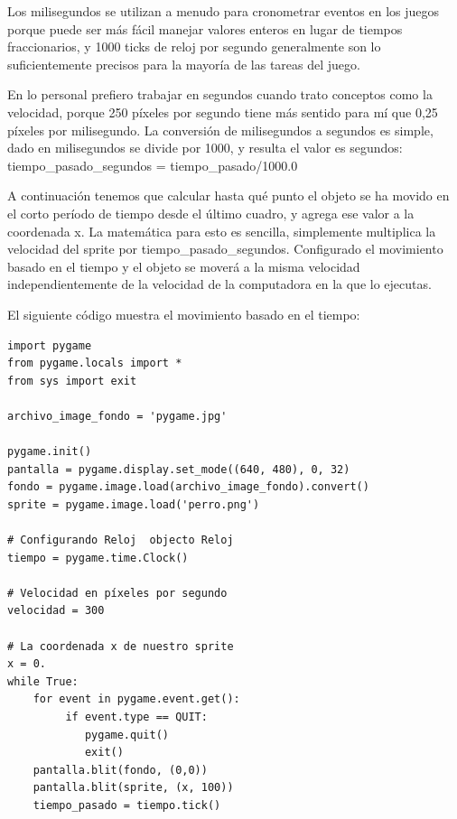 {Los milisegundos se utilizan a menudo para cronometrar eventos en los juegos porque puede ser más fácil manejar
valores enteros en lugar de tiempos fraccionarios, y 1000 ticks de reloj por segundo generalmente son lo 
suficientemente precisos para la mayoría de las tareas del juego. 


En lo personal  prefiero trabajar en segundos cuando trato conceptos como la velocidad, porque 250 píxeles por
segundo tiene más sentido para mí que 0,25 píxeles por milisegundo. La conversión de milisegundos a segundos es
simple, dado en milisegundos se divide por 1000, y resulta el valor es segundos:
 {\ttfamily tiempo\_pasado\_segundos = tiempo\_pasado/1000.0}






A continuación tenemos que calcular hasta qué punto el objeto se ha movido en el corto período de tiempo desde el último cuadro, 
y agrega ese valor a la coordenada x. La matemática para esto es sencilla, simplemente multiplica la velocidad del sprite por
{\ttfamily tiempo\_pasado\_segundos}.  Configurado el  movimiento basado en el tiempo y el objeto se moverá  a la misma velocidad independientemente de la velocidad de la computadora en la que lo ejecutas.


El siguiente código muestra el movimiento basado en el tiempo:


\hspace{-2.5cm}{\ttfamily \scriptsize movimiento}

\vspace{-0.24cm}
\hspace{-2.35cm}{\ttfamily \scriptsize \_tiempo.py}
\vspace{-0.8cm}
\begin{lstlisting}
import pygame
from pygame.locals import *
from sys import exit

archivo_image_fondo = 'pygame.jpg'

pygame.init()
pantalla = pygame.display.set_mode((640, 480), 0, 32)
fondo = pygame.image.load(archivo_image_fondo).convert()
sprite = pygame.image.load('perro.png')

# Configurando Reloj  objecto Reloj
tiempo = pygame.time.Clock()

# Velocidad en píxeles por segundo
velocidad = 300

# La coordenada x de nuestro sprite
x = 0.
while True:
    for event in pygame.event.get():
         if event.type == QUIT:
            pygame.quit()
            exit()
    pantalla.blit(fondo, (0,0))
    pantalla.blit(sprite, (x, 100))
    tiempo_pasado = tiempo.tick()


\end{lstlisting}}
